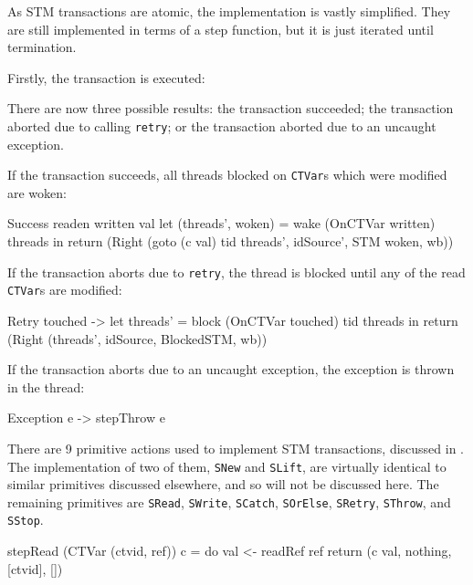 As STM transactions are atomic, the implementation is vastly
simplified. They are still implemented in terms of a step function,
but it is just iterated until termination.

Firstly, the transaction is executed:


There are now three possible results: the transaction succeeded; the
transaction aborted due to calling \verb|retry|; or the transaction
aborted due to an uncaught exception.

If the transaction succeeds, all threads blocked on \verb|CTVar|s
which were modified are woken:

\begin{haskellcode}
    Success readen written val
      let (threads', woken) = wake (OnCTVar written) threads
      in return (Right
         (goto (c val) tid threads', idSource', STM woken, wb))
\end{haskellcode}

If the transaction aborts due to \verb|retry|, the thread is blocked
until any of the read \verb|CTVar|s are modified:

\begin{haskellcode}
    Retry touched ->
      let threads' = block (OnCTVar touched) tid threads
      in return (Right (threads', idSource, BlockedSTM, wb))
\end{haskellcode}

If the transaction aborts due to an uncaught exception, the exception
is thrown in the thread:

\begin{haskellcode}
    Exception e -> stepThrow e
\end{haskellcode}

There are 9 primitive actions used to implement STM transactions,
discussed in . The implementation of two of
them, \verb|SNew| and \verb|SLift|, are virtually identical to similar
primitives discussed elsewhere, and so will not be discussed here. The
remaining primitives are \verb|SRead|, \verb|SWrite|, \verb|SCatch|,
\verb|SOrElse|, \verb|SRetry|, \verb|SThrow|, and \verb|SStop|.

\begin{haskellcode}
stepRead (CTVar (ctvid, ref)) c = do
  val <- readRef ref
  return (c val, nothing, [ctvid], [])
\end{haskellcode}

